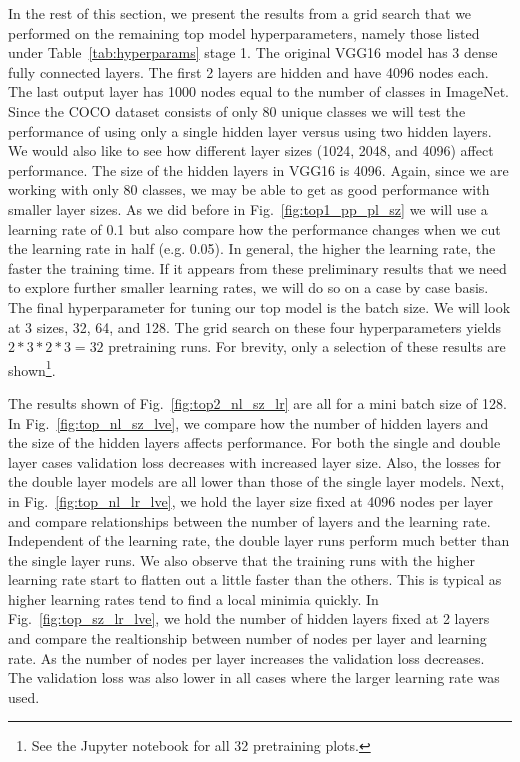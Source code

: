 \documentclass[12pt,journal,compsoc]{IEEEtran}
\begin{document}
In the rest of this section, we present the results from a grid search that we performed on the remaining top model hyperparameters, namely those listed under Table~\ref{tab:hyperparams} stage 1. The original VGG16 model has 3 dense fully connected layers. The first 2 layers are hidden and have 4096 nodes each. The last output layer has 1000 nodes equal to the number of classes in ImageNet. Since the COCO dataset consists of only 80 unique classes we will test the performance of using only a single hidden layer versus using two hidden layers. We would also like to see how different layer sizes (1024, 2048, and 4096) affect performance. The size of the hidden layers in VGG16 is 4096. Again, since we are working with only 80 classes, we may be able to get as good performance with smaller layer sizes. As we did before in Fig.~\ref{fig:top1_pp_pl_sz} we will use a learning rate of 0.1 but also compare how the performance changes when we cut the learning rate in half (e.g. 0.05). In general, the higher the learning rate, the faster the training time. If it appears from these preliminary results that we need to explore further smaller learning rates, we will do so on a case by case basis. The final hyperparameter for tuning our top model is the batch size. We will look at 3 sizes, 32, 64, and 128. The grid search on these four hyperparameters yields $2*3*2*3 = 32$ pretraining runs. For brevity, only a selection of these results are shown\footnote{See the Jupyter notebook for all 32 pretraining plots.}. 

The results shown of Fig.~\ref{fig:top2_nl_sz_lr} are all for a mini batch size of 128. In Fig.~\ref{fig:top_nl_sz_lve}, we compare how the number of hidden layers and the size of the hidden layers affects performance. For both the single and double layer cases validation loss decreases with increased layer size. Also, the losses for the double layer models are all lower than those of the single layer models. Next, in Fig.~\ref{fig:top_nl_lr_lve}, we hold the layer size fixed at 4096 nodes per layer and compare relationships between the number of layers and the learning rate. Independent of the learning rate, the double layer runs perform much better than the single layer runs. We also observe that the training runs with the higher learning rate start to flatten out a little faster than the others. This is typical as higher learning rates tend to find a local minimia quickly. In Fig.~\ref{fig:top_sz_lr_lve}, we hold the number of hidden layers fixed at 2 layers and compare the realtionship between number of nodes per layer and learning rate. As the number of nodes per layer increases the validation loss decreases. The validation loss was also lower in all cases where the larger learning rate was used. 
\end{document}

